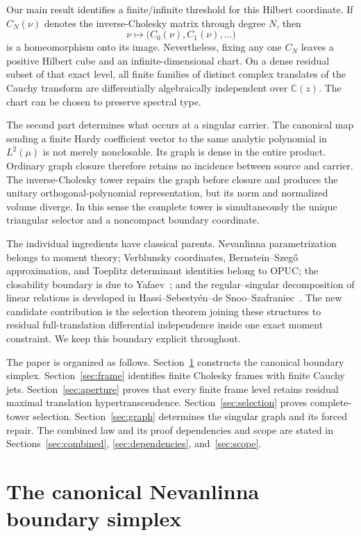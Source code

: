 \documentclass[11pt]{article}
\newcommand{\C}{\mathbb C}
\begin{document}
Our main result identifies a finite/infinite threshold for this Hilbert coordinate.  If
$C_N(\nu)$ denotes the inverse-Cholesky matrix through degree $N$, then
\[
  \nu\longmapsto \bigl(C_0(\nu),C_1(\nu),\ldots\bigr)
\]
is a homeomorphism onto its image.  Nevertheless, fixing any one $C_N$ leaves a positive
Hilbert cube and an infinite-dimensional chart.  On a dense residual subset of that exact level, all finite
families of distinct complex translates of the Cauchy transform are differentially algebraically
independent over $\C(z)$.  The chart can be chosen to preserve spectral type.

The second part determines what occurs at a singular carrier.  The canonical map sending a finite
Hardy coefficient vector to the same analytic polynomial in $L^2(\mu)$ is not merely
nonclosable.  Its graph is dense in the entire product.  Ordinary graph closure therefore retains
no incidence between source and carrier.  The inverse-Cholesky tower repairs the graph before
closure and produces the unitary orthogonal-polynomial representation, but its norm and normalized
volume diverge.  In this sense the complete tower is simultaneously the unique triangular
selector and a noncompact boundary coordinate.

The individual ingredients have classical parents.  Nevanlinna parametrization belongs to moment
theory; Verblunsky coordinates, Bernstein--Szeg\H{o} approximation, and Toeplitz determinant
identities belong to OPUC; the closability boundary is due to Yafaev~\cite{Yafaev2016}; and the
regular--singular decomposition of linear relations is developed in
Hassi--Sebesty\'en--de Snoo--Szafraniec~\cite{HassiEtAl2007}.  The new candidate contribution is
the selection theorem joining these structures to residual full-translation differential
independence inside one exact moment constraint.  We keep this boundary explicit throughout.

The paper is organized as follows.  Section~\ref{sec:boundary} constructs the canonical boundary
simplex.  Section~\ref{sec:frame} identifies finite Cholesky frames with finite Cauchy jets.
Section~\ref{sec:aperture} proves that every finite frame level retains residual maximal
translation hypertranscendence.  Section~\ref{sec:selection} proves complete-tower selection.
Section~\ref{sec:graph} determines the singular graph and its forced repair.  The combined law and
its proof dependencies and scope are stated in
Sections~\ref{sec:combined}, \ref{sec:dependencies}, and~\ref{sec:scope}.

\section{The canonical Nevanlinna boundary simplex}\label{sec:boundary}
\end{document}

